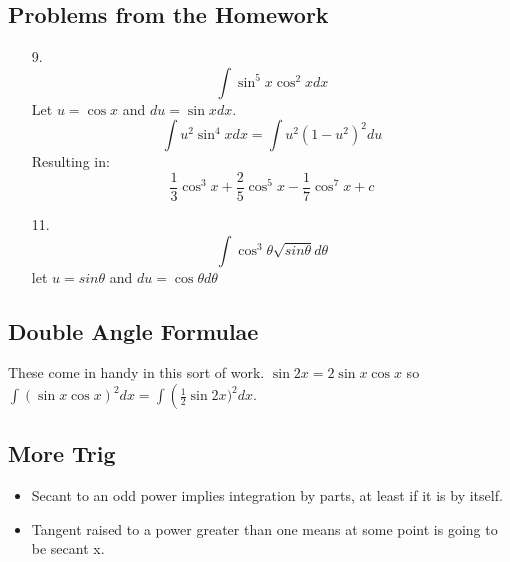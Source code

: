 \documentclass[11pt]{article}
\begin{document}
\subsection{Problems from the Homework}
\begin{enumerate}
	\item[9. ] \[
			\int \sin ^5 x \cos ^2 x dx
		\]
		Let $u = \cos x$ and $du = \sin x dx$. \[
			\int u^2 \sin ^4 x dx = \int u^2 (1-u^2)^2 du
		\]
		Resulting in: \[
			\frac{1}{3} \cos ^3 x + \frac{2}{5} \cos ^5 x - \frac{1}{7} \cos ^7 x + c
		\]
	\item[11. ] \[
			\int \cos ^3 \theta \sqrt{sin \theta} d\theta
		\]
		let $u = sin \theta$ and $du = \cos \theta d \theta$
\end{enumerate}
\subsection{Double Angle Formulae}
	These come in handy in this sort of work.  $\sin 2x = 2 \sin x \cos x$ so 
	$ \int \left( \sin x \cos x \right) ^2 dx = \int \left(\frac{1}{2}\sin 2x)^2
		dx$.

\subsection{More Trig}
\begin{itemize}
	\item Secant to an odd power implies integration by parts, at least if it is 
		by itself.
	\item Tangent raised to a power greater than one means at some point is going
		to be secant x.
\end{itemize}
\end{document}
